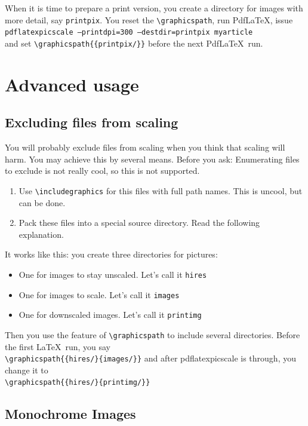 \documentclass[10pt,a4paper]{article}
\begin{document}
When it is time to prepare a print version, you create a directory for images
with more detail, say \texttt{printpix}. You reset the  \verb|\graphicspath|,
run Pdf\LaTeX, issue\\
\texttt{pdflatexpicscale --printdpi=300 --destdir=printpix myarticle}\\
and set \verb|\graphicspath{{printpix/}}| before the next Pdf\LaTeX\ run.

\section{Advanced usage}

\subsection{Excluding files from scaling}

You will probably exclude files from scaling when you think that scaling will
harm. You may achieve this by several means. Before you ask: Enumerating
files to exclude is not really cool, so this is not supported.

\begin{enumerate}
\item Use \verb|\includegraphics| for this files with full path names. This is
  uncool, but can be done.
\item Pack these files into a special source directory. Read the following
  explanation. 
\end{enumerate}

It works like this: you create three directories for pictures:

\begin{itemize}
\item One for images to stay unscaled. Let's call it \texttt{hires}
\item One for images to scale. Let's call it \texttt{images}
\item One for downscaled images. Let's call it \texttt{printimg}
\end{itemize}

Then you use the feature of \verb|\graphicspath| to include several
directories. Before the first \LaTeX\ run, you say\\
\verb|\graphicspath{{hires/}{images/}}|
and after pdflatexpicscale is through, you change it to\\
\verb|\graphicspath{{hires/}{printimg/}}|

\subsection{Monochrome Images}
\end{document}
